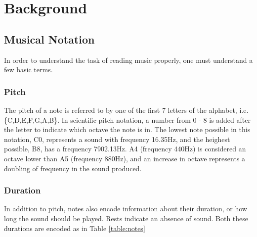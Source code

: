 \section{Background}
    \subsection{Musical Notation}
        In order to understand the task of reading music properly, one must understand a few basic terms.

        \subsubsection{Pitch}
            The pitch of a note is referred to by one of the first 7 letters of the alphabet, i.e. \{C,D,E,F,G,A,B\}.
            In scientific pitch notation, a number from 0 - 8 is added after the letter to indicate which octave the note is in.
            The lowest note possible in this notation, C0, represents a sound with frequency 16.35Hz, and the heighest possible, B8, has a frequency 7902.13Hz.
            A4 (frequency 440Hz) is considered an octave lower than A5 (frequency 880Hz), and an increase in octave represents a doubling of frequency in the sound produced.
        \subsubsection{Duration}
            In addition to pitch, notes also encode information about their duration, or how long the sound should be played. 
            Rests indicate an absence of sound. Both these durations are encoded as in Table \ref{table:notes}

